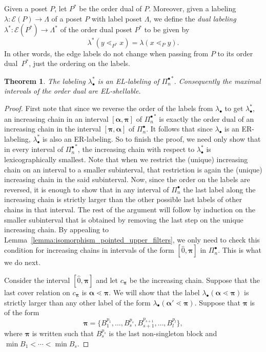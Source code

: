 \documentclass[11pt]{article}
\newtheorem{theo}{Theorem}[section]
\theoremstyle{definition}
\numberwithin{equation}{section}
\newcommand{\cover}{\lessdot}
\newcommand{\bpi}{\pmb{\pi}}
\newcommand{\balpha}{\pmb{\alpha}}
\begin{document}
Given a poset $P$, let $P^*$ be the order dual of $P$.  Moreover, given a labeling $\lambda:\mathcal{E}(P)\rightarrow \Lambda$ of a poset $P$ with label poset $\Lambda$, we define the \emph{dual labeling} $\lambda^*:\mathcal{E}(P^*)\rightarrow \Lambda^*$ of the order dual poset $P^*$ to be given by
$$
\lambda^*(y\cover_{P^*} x)  = \lambda(x\cover_{P} y).
$$
In other words, the edge labels do not change when passing from $P$ to its order dual~$P^*$, just the ordering on the labels.  


\begin{theo}\label{theorem:pointed_dual_EL_labeling}
The labeling  $\lambda^*_{\bullet}$  is an EL-labeling  of ${\Pi_n^{\bullet}}^*$.  Consequently the maximal intervals of the order dual are EL-shellable.
\end{theo}
\begin{proof}

First note that since we reverse the order of the labels from  $\lambda_{\bullet}$  to get $\lambda^*_{\bullet}$,  an  increasing chain in an interval $[\balpha, \bpi]$ of ${\Pi_n^{\bullet}}^*$ is exactly the order dual of an  increasing chain in the interval $[\bpi, \balpha]$ of  ${\Pi_n^{\bullet}}$.  It follows that since  $\lambda_\bullet$ is an ER-labeling,   $\lambda^*_{\bullet}$ is also an ER-labeling.  So to finish the proof, we need only show that in every interval of ${\Pi_n^{\bullet}}^*$, the increasing chain with respect to $\lambda^*_\bullet$ is lexicographically smallest. Note that when we restrict the (unique) increasing chain on an interval to a smaller subinterval, that restriction is again the (unique) increasing chain in the said subinterval. Now, since the order on the labels are reversed, it is enough to show that in any interval  of ${\Pi_n^{\bullet}}$ the last label along the increasing chain is strictly larger than the other possible last labels of other chains in that interval. The rest of the argument will follow by induction on the smaller subinterval that is obtained by removing the last step on the unique increasing chain.  By appealing to Lemma~\ref{lemma:isomorphism_pointed_upper_filters}, we  only need to check this   condition for increasing chains   in intervals of the form $[\hat{0},\bpi]$ in ${\Pi_n^{\bullet}}$. This is what we do next.


Consider the interval $[\hat{0}, \bpi]$ and let $c_{\bpi}$  be the increasing chain.  Suppose that the last cover relation on $c_{\bpi}$  is $\balpha\cover \bpi$.  We will show that the label $\lambda_\bullet(\balpha\cover \bpi)$ is strictly larger than any other label of the form $\lambda_\bullet(\balpha'\cover \bpi)$.    Suppose that $\bpi$   is of the form 
$$
\bpi=\{B_1^{p_1},\dots,B_s^{p_s},B_{s+1}^{p_{s+1}},\dots,B_l^{p_l}\},
$$
where $\bpi$ is written such that $B_s^{p_s}$ is the last non-singleton block and $\min B_1 <\cdots <\min B_s$.


\end{proof}
\end{document}
